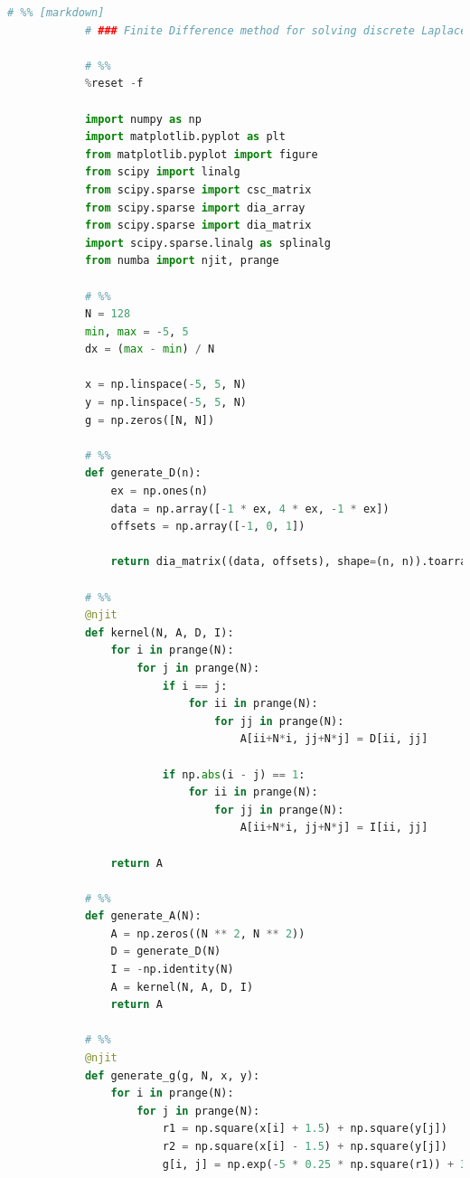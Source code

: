 \documentclass[12pt]{article}
\begin{document}
        \begin{lstlisting}[language={Python}]
            # %% [markdown]
            # ### Finite Difference method for solving discrete Laplace Equation
            
            # %%
            %reset -f
            
            import numpy as np
            import matplotlib.pyplot as plt
            from matplotlib.pyplot import figure
            from scipy import linalg
            from scipy.sparse import csc_matrix
            from scipy.sparse import dia_array
            from scipy.sparse import dia_matrix
            import scipy.sparse.linalg as splinalg
            from numba import njit, prange
            
            # %%
            N = 128
            min, max = -5, 5
            dx = (max - min) / N
            
            x = np.linspace(-5, 5, N)
            y = np.linspace(-5, 5, N)
            g = np.zeros([N, N])
            
            # %%
            def generate_D(n):
                ex = np.ones(n)
                data = np.array([-1 * ex, 4 * ex, -1 * ex])
                offsets = np.array([-1, 0, 1])
                
                return dia_matrix((data, offsets), shape=(n, n)).toarray()
            
            # %%
            @njit
            def kernel(N, A, D, I):
                for i in prange(N):
                    for j in prange(N):
                        if i == j:
                            for ii in prange(N):
                                for jj in prange(N):
                                    A[ii+N*i, jj+N*j] = D[ii, jj]
                                    
                        if np.abs(i - j) == 1:
                            for ii in prange(N):
                                for jj in prange(N):
                                    A[ii+N*i, jj+N*j] = I[ii, jj]
                                    
                return A
            
            # %%
            def generate_A(N):
                A = np.zeros((N ** 2, N ** 2))
                D = generate_D(N)
                I = -np.identity(N)
                A = kernel(N, A, D, I)
                return A
            
            # %%
            @njit
            def generate_g(g, N, x, y):
                for i in prange(N):
                    for j in prange(N):
                        r1 = np.square(x[i] + 1.5) + np.square(y[j])
                        r2 = np.square(x[i] - 1.5) + np.square(y[j])
                        g[i, j] = np.exp(-5 * 0.25 * np.square(r1)) + 3 * 0.5 * np.exp(-np.square(r2))
            

\end{lstlisting}
\end{document}
